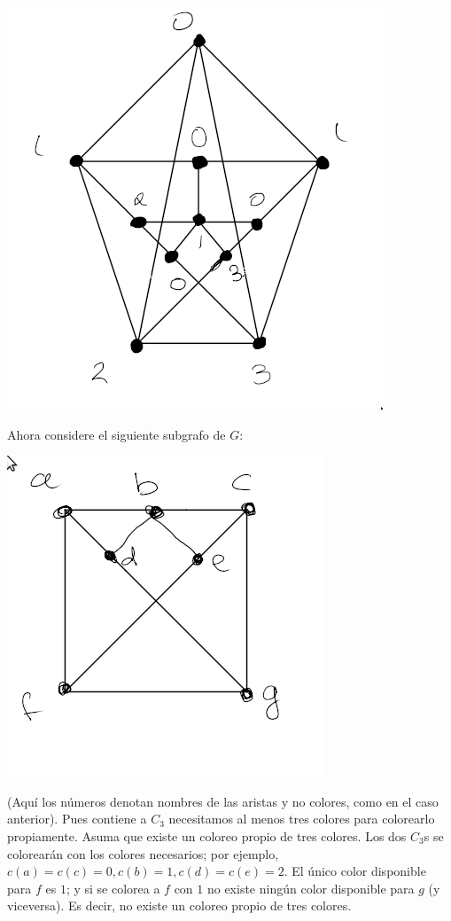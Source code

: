 \documentclass[a4paper, 12pt]{article}
\begin{document}
\begin{center}
\includegraphics[scale=0.3]{Grafo10}
\end{center}

Ahora considere el siguiente subgrafo de $G$:

\begin{center}
\includegraphics[scale=0.3]{Subgrafo10}
\end{center}

(Aquí los números denotan nombres de las aristas y no colores, como en el caso
anterior). Pues contiene a $C_3$ necesitamos al menos tres colores para
colorearlo propiamente. Asuma que existe un coloreo propio de tres colores. Los
dos $C_3$s se colorearán con los colores necesarios; por ejemplo, $c(a) = c(c) =
0, c(b) = 1, c(d) = c(e) = 2$. El único color disponible para $f$ es $1$; y si
se colorea a $f$ con $1$ no existe ningún color disponible para $g$ (y
viceversa). Es decir, no existe un coloreo propio de tres colores. 
\end{document}
